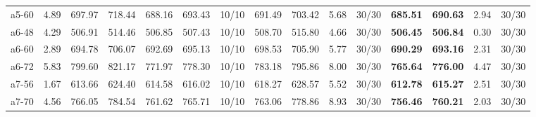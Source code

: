 \documentclass[aspectratio=1610]{beamer}
\begin{document}
\begin{frame}[noframenumbering]
\begin{table}[]
{\begin{tabular}{lrrrrrrrrrrrrrr}
a5-60                                          & 4.89                                                         & 697.97  & \multicolumn{1}{r|}{718.44}   & 688.16          & 693.43                                 & \multicolumn{1}{r|}{10/10} & 691.49        & 703.42         & 5.68         & \multicolumn{1}{r|}{30/30}       & \textbf{685.51}     & {\color[HTML]{FE0000} \textbf{690.63}}    & 2.94     & 30/30   \\
a6-48                                          & 4.29                                                         & 506.91  & \multicolumn{1}{r|}{514.46}   & 506.85          & 507.43                                 & \multicolumn{1}{r|}{10/10} & 508.70        & 515.80         & 4.66         & \multicolumn{1}{r|}{30/30}       & \textbf{506.45}     & {\color[HTML]{FE0000} \textbf{506.84}}    & 0.30     & 30/30   \\
a6-60                                          & 2.89                                                         & 694.78  & \multicolumn{1}{r|}{706.07}   & 692.69          & 695.13                                 & \multicolumn{1}{r|}{10/10} & 698.53        & 705.90         & 5.77         & \multicolumn{1}{r|}{30/30}       & \textbf{690.29}     & {\color[HTML]{FE0000} \textbf{693.16}}    & 2.31     & 30/30   \\
a6-72                                          & 5.83                                                         & 799.60  & \multicolumn{1}{r|}{821.17}   & 771.97          & 778.30                                 & \multicolumn{1}{r|}{10/10} & 783.18        & 795.86         & 8.00         & \multicolumn{1}{r|}{30/30}       & \textbf{765.64}     & {\color[HTML]{FE0000} \textbf{776.00}}    & 4.47     & 30/30   \\
a7-56                                          & 1.67                                                         & 613.66  & \multicolumn{1}{r|}{624.40}   & 614.58          & 616.02                                 & \multicolumn{1}{r|}{10/10} & 618.27        & 628.57         & 5.52         & \multicolumn{1}{r|}{30/30}       & \textbf{612.78}     & {\color[HTML]{FE0000} \textbf{615.27}}    & 2.51     & 30/30   \\
a7-70                                          & 4.56                                                         & 766.05  & \multicolumn{1}{r|}{784.54}   & 761.62          & 765.71                                 & \multicolumn{1}{r|}{10/10} & 763.06        & 778.86         & 8.93         & \multicolumn{1}{r|}{30/30}       & \textbf{756.46}     & {\color[HTML]{FE0000} \textbf{760.21}}    & 2.03     & 30/30   \\

\end{tabular}}
\end{table}
\end{frame}
\end{document}
